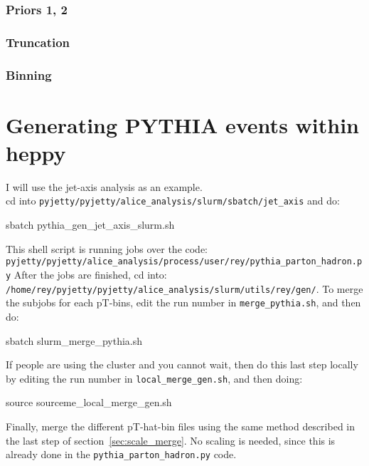 \documentclass[12pt]{article}
\begin{document}
\subsubsection{Priors 1, 2}
\subsubsection{Truncation}
\subsubsection{Binning}

\section{Generating PYTHIA events within heppy}

I will use the jet-axis analysis as an example. \\
cd into \verb|pyjetty/pyjetty/alice_analysis/slurm/sbatch/jet_axis| and do:

\begin{tcolorbox}
\begin{verbnobox}[\scriptsize]
sbatch pythia_gen_jet_axis_slurm.sh
\end{verbnobox}  
\end{tcolorbox}

This shell script is running jobs over the code: \\ \verb|pyjetty/pyjetty/alice_analysis/process/user/rey/pythia_parton_hadron.py|
After the jobs are finished, cd into: \verb|/home/rey/pyjetty/pyjetty/alice_analysis/slurm/utils/rey/gen/|. 
To merge the subjobs for each pT-bins, edit the run number in \verb|merge_pythia.sh|, and then do:

\begin{tcolorbox}
\begin{verbnobox}[\scriptsize]
sbatch slurm_merge_pythia.sh
\end{verbnobox}  
\end{tcolorbox}

If people are using the cluster and you cannot wait, then do this last step locally by editing the run number in \verb|local_merge_gen.sh|, and then doing:

\begin{tcolorbox}
\begin{verbnobox}[\scriptsize]
source sourceme_local_merge_gen.sh
\end{verbnobox}  
\end{tcolorbox}

Finally, merge the different pT-hat-bin files using the same method described in the last step of section~\ref{sec:scale_merge}.
No scaling is needed, since this is already done in the \verb|pythia_parton_hadron.py| code.





\end{document}
